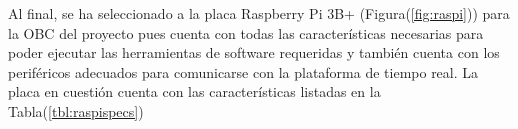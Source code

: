     Al final, se ha seleccionado a la placa Raspberry Pi 3B+ (Figura(\ref{fig:raspi})) para la OBC del proyecto pues cuenta con todas las características 
    necesarias para poder ejecutar las herramientas de software requeridas y también cuenta con los periféricos adecuados para 
    comunicarse con la plataforma de tiempo real. La placa en cuestión cuenta con las características listadas en la Tabla(\ref{tbl:raspispecs})

    
    \begin{table}[]
        \centering
        \caption{Características de la placa Raspberry Pi 3 model B+. Fuente: \cite{raspi}}
        \label{tbl:raspispecs}
        \end{table}




